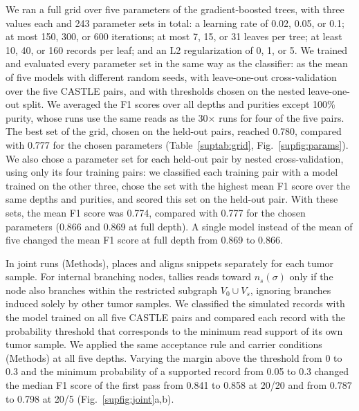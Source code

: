 We ran a full grid over five parameters of the gradient-boosted trees, with three values each and 243 parameter sets in total: a learning rate of 0.02, 0.05, or 0.1; at most 150, 300, or 600 iterations; at most 7, 15, or 31 leaves per tree; at least 10, 40, or 160 records per leaf; and an L2 regularization of 0, 1, or 5.
We trained and evaluated every parameter set in the same way as the classifier: as the mean of five models with different random seeds, with leave-one-out cross-validation over the five CASTLE pairs, and with thresholds chosen on the nested leave-one-out split.
We averaged the F1 scores over all depths and purities except 100\% purity, whose runs use the same reads as the 30$\times$ runs for four of the five pairs.
The best set of the grid, chosen on the held-out pairs, reached 0.780, compared with 0.777 for the chosen parameters (Table~\ref{suptab:grid}, Fig.~\ref{supfig:params}).
We also chose a parameter set for each held-out pair by nested cross-validation, using only its four training pairs: we classified each training pair with a model trained on the other three, chose the set with the highest mean F1 score over the same depths and purities, and scored this set on the held-out pair.
With these sets, the mean F1 score was 0.774, compared with 0.777 for the chosen parameters (0.866 and 0.869 at full depth).
A single model instead of the mean of five changed the mean F1 score at full depth from 0.869 to 0.866.


In joint runs (Methods), \tool{} places and aligns snippets separately for each tumor sample.
For internal branching nodes, \tool{} tallies reads toward $n_s(\sigma)$ only if the node also branches within the restricted subgraph $V_0 \cup V_s$, ignoring branches induced solely by other tumor samples.
We classified the simulated records with the model trained on all five CASTLE pairs and compared each record with the probability threshold that corresponds to the minimum read support of its own tumor sample.
We applied the same acceptance rule and carrier conditions (Methods) at all five depths.
Varying the margin above the threshold from 0 to 0.3 and the minimum probability of a supported record from 0.05 to 0.3 changed the median F1 score of the first pass from 0.841 to 0.858 at 20/20 and from 0.787 to 0.798 at 20/5 (Fig.~\ref{supfig:joint}a,b).

